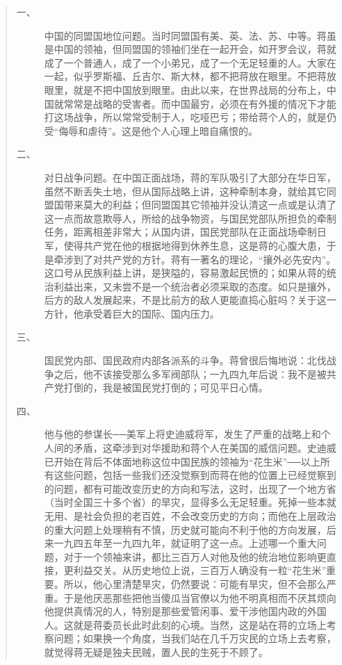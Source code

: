 \begin{quote}
	\begin{description}
		\item [一、] 	中国的同盟国地位问题。当时同盟国有美、英、法、苏、中等。蒋虽是中国的领袖，但同盟国的领袖们坐在一起开会，如开罗会议，蒋就成了一个普通人，成了一个小弟兄，成了一个无足轻重的人。大家在一起，似乎罗斯福、丘吉尔、斯大林，都不把蒋放在眼里。不把蒋放眼里，就是不把中国放到眼里。由此以来，在世界战局的分布上，中国就常常是战略的受害者。而中国最穷，必须在有外援的情况下才能打这场战争，所以常常受制于人，吃哑巴亏；带给蒋个人的，就是仍受“侮辱和虐待”。这是他个人心理上暗自痛恨的。\\
		
		\item [二、] 	对日战争问题。在中国正面战场，蒋的军队吸引了大部分在华日军，虽然不断丢失土地，但从国际战略上讲，这种牵制本身，就给其它同盟国带来莫大的利益；但同盟国其它领袖并没认清这一点或是认清了这一点而故意欺辱人，所给的战争物资，与国民党部队所担负的牵制任务，距离相差非常大；从国内讲，国民党部队在正面战场牵制日军，使得共产党在他的根据地得到休养生息，这是蒋的心腹大患，于是牵涉到了对共产党的方针。蒋有一著名的理论，“攘外必先安内”。这口号从民族利益上讲，是狭隘的，容易激起民愤的；如果从蒋的统治利益出来，又未尝不是一个统治者必须采取的态度。如只是攘外，后方的敌人发展起来，不是比前方的敌人更能直捣心脏吗？关于这一方针，他承受着巨大的国际、国内压力。\\
		
		\item [三、] 	国民党内部、国民政府内部各派系的斗争。蒋曾很后悔地说：北伐战争之后，他不该接受那么多军阀部队；一九四九年后说：我不是被共产党打倒的，我是被国民党打倒的；可见平日心情。\\
		
		\item [四、] 	他与他的参谋长{\Add ──}美军上将史迪威将军，发生了严重的战略上和个人间的矛盾，这牵涉到对华援助和蒋个人在美国的威信问题。史迪威已开始在背后不体面地称这位中国民族的领袖为“花生米”{\Add ──}以上所有这些问题，包括一些我们还没觉察到而蒋在他的位置上已经觉察到的问题，都有可能改变历史的方向和写法，这时，出现了一个地方省（当时全国三十多个省）的旱灾，显得多么无足轻重。死掉一些本就无用、是社会负担的老百姓，不会改变历史的方向；而他在上层政治的重大问题上处理稍有不慎，历史就可能向不利于他的方向发展，后来一九四五年至一九四九年，就证明了这一点。上述哪一个重大问题，对于一个领袖来讲，都比三百万人对他及他的统治地位影响更直接，更利益交关。从历史地位上说，三百万人确没有一粒“花生米”重要。所以，他心里清楚旱灾，仍然要说：可能有旱灾，但不会那么严重。于是他厌恶那些把他当傻瓜当官僚以为他不明真相而不厌其烦向他提供真情况的人，特别是那些爱管闲事、爱干涉他国内政的外国人。这就是蒋委员长此时此刻的心境。当然，这是站在蒋的立场上考察问题；如果换一个角度，当我们站在几千万灾民的立场上去考察，就觉得蒋无疑是独夫民贼，置人民的生死于不顾了。\\
	\end{description}
\end{quote}

